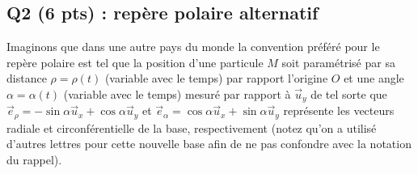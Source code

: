 \documentclass[french,10pt]{article}
\begin{document}
	\subsection*{Q2 (6 pts) : repère polaire alternatif }
		Imaginons que dans une autre pays du monde la convention préféré pour le repère polaire est tel que la position d'une particule $M$ soit paramétrisé par sa distance $\rho = \rho(t)$ (variable avec le temps) par rapport l'origine $O$ et une angle $\alpha = \alpha(t)$ (variable avec le temps) mesuré par rapport à $\vec{u}_y$ de tel sorte que $\vec{e}_{\rho} = -\sin{\alpha} \vec{u}_x + \cos{\alpha} \vec{u}_y$ et $\vec{e}_{\alpha} = \cos{\alpha} \vec{u}_x + \sin{\alpha} \vec{u}_y$ représente les vecteurs radiale et circonférentielle de la base, respectivement (notez qu'on a utilisé d'autres lettres pour cette nouvelle base afin de ne pas confondre avec la notation du rappel).
\end{document}

